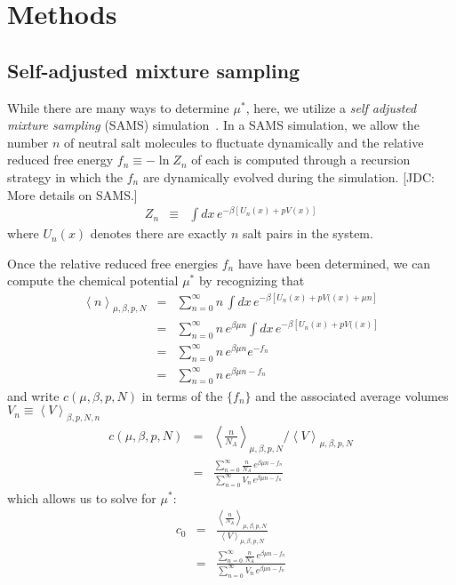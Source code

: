 \documentclass[aps,pre,twocolumn,nofootinbib,superscriptaddress,linenumbers,11point]{revtex4-1}
\begin{document}

\section*{Methods}
\label{section:methods}

\subsection*{Self-adjusted mixture sampling}

While there are many ways to determine $\mu^*$, here, we utilize a \emph{self adjusted mixture sampling} (SAMS) simulation~\cite{sams}.
In a SAMS simulation, we allow the number $n$ of neutral salt molecules to fluctuate dynamically and the relative reduced free energy $f_n \equiv - \ln Z_n$ of each is computed through a recursion strategy in which the $f_n$ are dynamically evolved during the simulation.
{\color{red}[JDC: More details on SAMS.]}
\begin{eqnarray}
Z_n &\equiv& \int dx \, e^{-\beta [U_n(x) + p V(x)]}
\end{eqnarray}
where $U_n(x)$ denotes there are exactly $n$ salt pairs in the system.

Once the relative reduced free energies $f_n$ have have been determined, we can compute the chemical potential $\mu^*$ by recognizing that
\begin{eqnarray}
\left< n \right>_{\mu, \beta, p, N} &=& \sum_{n = 0}^\infty n \, \int dx \, e^{-\beta [ U_n(x) + p V((x) + \mu n ]} \\
&=&  \sum_{n = 0}^\infty n \, e^{\beta \mu n} \int dx \, e^{-\beta [ U_n(x) + p V((x) ]} \\
&=&  \sum_{n = 0}^\infty n \, e^{\beta \mu n} e^{-f_n} \\
&=&  \sum_{n = 0}^\infty n \, e^{\beta \mu n -f_n}
\end{eqnarray}
and write $c(\mu, \beta, p, N)$ in terms of the $\{f_n\}$ and the associated average volumes $V_n \equiv \left< V \right>_{\beta, p, N, n}$
\begin{eqnarray}
c(\mu, \beta, p, N) &=& \left< \frac{n}{N_A} \right>_{\mu, \beta, p, N} / \left< V \right>_{\mu, \beta, p, N} \\
&=& \frac{\sum_{n = 0}^\infty \frac{n}{N_A} \, e^{\beta \mu n -f_n}}{\sum_{n = 0}^\infty V_n \, e^{\beta \mu n -f_n}}
\end{eqnarray}
which allows us to solve for $\mu^*$:
\begin{eqnarray}
c_0 &=& \frac{\left< \frac{n}{N_A} \right>_{\mu, \beta, p, N}}{\left< V \right>_{\mu, \beta, p, N}} \\
&=& \frac{\sum_{n = 0}^\infty \frac{n}{N_A} \, e^{\beta \mu n -f_n}}{\sum_{n = 0}^\infty V_n \, e^{\beta \mu n -f_n}}
\end{eqnarray}
\end{document}
